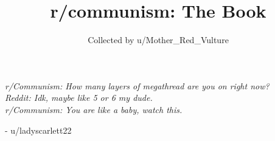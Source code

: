 \documentclass[11pt,a4paper,oneside,notitlepage]{book}
\title{r/communism: The Book}
\author{Collected by u/Mother\_Red\_Vulture}
\date{}
\begin{document}
\frontmatter

\maketitle
\vfill
\newpage
\hspace{0pt}
\vfill
\begin{center}
\textit{r/Communism: How many layers of megathread are you on right now?\\
Reddit: Idk, maybe like 5 or 6 my dude.\\
r/Communism: You are like a baby, watch this.}
\end{center}
\begin{flushright}
- u/ladyscarlett22
\end{flushright}
\vfill
\tableofcontents

\mainmatter

\end{document}
